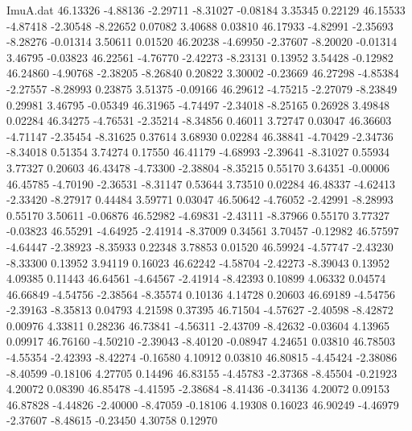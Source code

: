 \begin{filecontents}{ImuA.dat}
  46.13326   -4.88136   -2.29711   -8.31027   -0.08184    3.35345    0.22129
  46.15533   -4.87418   -2.30548   -8.22652    0.07082    3.40688    0.03810
  46.17933   -4.82991   -2.35693   -8.28276   -0.01314    3.50611    0.01520
  46.20238   -4.69950   -2.37607   -8.20020   -0.01314    3.46795   -0.03823
  46.22561   -4.76770   -2.42273   -8.23131    0.13952    3.54428   -0.12982
  46.24860   -4.90768   -2.38205   -8.26840    0.20822    3.30002   -0.23669
  46.27298   -4.85384   -2.27557   -8.28993    0.23875    3.51375   -0.09166
  46.29612   -4.75215   -2.27079   -8.23849    0.29981    3.46795   -0.05349
  46.31965   -4.74497   -2.34018   -8.25165    0.26928    3.49848    0.02284
  46.34275   -4.76531   -2.35214   -8.34856    0.46011    3.72747    0.03047
  46.36603   -4.71147   -2.35454   -8.31625    0.37614    3.68930    0.02284
  46.38841   -4.70429   -2.34736   -8.34018    0.51354    3.74274    0.17550
  46.41179   -4.68993   -2.39641   -8.31027    0.55934    3.77327    0.20603
  46.43478   -4.73300   -2.38804   -8.35215    0.55170    3.64351   -0.00006
  46.45785   -4.70190   -2.36531   -8.31147    0.53644    3.73510    0.02284
  46.48337   -4.62413   -2.33420   -8.27917    0.44484    3.59771    0.03047
  46.50642   -4.76052   -2.42991   -8.28993    0.55170    3.50611   -0.06876
  46.52982   -4.69831   -2.43111   -8.37966    0.55170    3.77327   -0.03823
  46.55291   -4.64925   -2.41914   -8.37009    0.34561    3.70457   -0.12982
  46.57597   -4.64447   -2.38923   -8.35933    0.22348    3.78853    0.01520
  46.59924   -4.57747   -2.43230   -8.33300    0.13952    3.94119    0.16023
  46.62242   -4.58704   -2.42273   -8.39043    0.13952    4.09385    0.11443
  46.64561   -4.64567   -2.41914   -8.42393    0.10899    4.06332    0.04574
  46.66849   -4.54756   -2.38564   -8.35574    0.10136    4.14728    0.20603
  46.69189   -4.54756   -2.39163   -8.35813    0.04793    4.21598    0.37395
  46.71504   -4.57627   -2.40598   -8.42872    0.00976    4.33811    0.28236
  46.73841   -4.56311   -2.43709   -8.42632   -0.03604    4.13965    0.09917
  46.76160   -4.50210   -2.39043   -8.40120   -0.08947    4.24651    0.03810
  46.78503   -4.55354   -2.42393   -8.42274   -0.16580    4.10912    0.03810
  46.80815   -4.45424   -2.38086   -8.40599   -0.18106    4.27705    0.14496
  46.83155   -4.45783   -2.37368   -8.45504   -0.21923    4.20072    0.08390
  46.85478   -4.41595   -2.38684   -8.41436   -0.34136    4.20072    0.09153
  46.87828   -4.44826   -2.40000   -8.47059   -0.18106    4.19308    0.16023
  46.90249   -4.46979   -2.37607   -8.48615   -0.23450    4.30758    0.12970

\end{filecontents}
